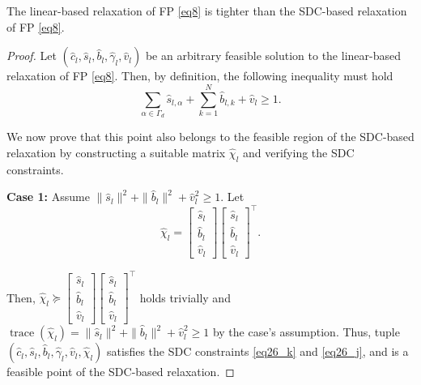 \documentclass[10pt,a4paper]{amsart}
\begin{document}
\begin{theorem} \label{thm4_2}
The linear-based relaxation of FP \eqref{eq8} is tighter than the SDC-based relaxation of FP \eqref{eq8}.
\end{theorem}

\begin{proof}
Let $\left(\hat{c}_l, \hat{s}_l, \hat{b}_l, \hat{\gamma}_l, \hat{v}_l\right)$ be an arbitrary feasible solution to the linear-based relaxation of FP \eqref{eq8}. Then, by definition, the following inequality must hold
\begin{equation} \label{eq:sum1}
\sum_{\alpha \in \Gamma_d} \hat{s}_{l,\alpha} + \sum_{k=1}^N \hat{b}_{l,k} + \hat{v}_l \ge 1.
\end{equation}

We now prove that this point also belongs to the feasible region of the SDC-based relaxation by constructing a suitable matrix $\hat{\chi}_l$ and verifying the SDC constraints.

\textbf{Case 1:} Assume $\|\hat{s}_l\|^2 + \|\hat{b}_l\|^2 + \hat{v}_l^2 \ge 1$. Let
\begin{equation}
\hat{\chi}_l = 
\begin{bmatrix}
\hat{s}_l \\
\hat{b}_l \\
\hat{v}_l
\end{bmatrix}
\begin{bmatrix}
\hat{s}_l \\
\hat{b}_l \\
\hat{v}_l
\end{bmatrix}^\top.
\end{equation}

Then, $\hat{\chi}_l \succeq \begin{bmatrix} \hat{s}_l \\ \hat{b}_l \\ \hat{v}_l \end{bmatrix} \begin{bmatrix} \hat{s}_l \\ \hat{b}_l \\ \hat{v}_l \end{bmatrix}^\top$ holds trivially and $\operatorname{trace}(\hat{\chi}_l)=\|\hat{s}_l\|^2 + \|\hat{b}_l\|^2 + \hat{v}_l^2 \ge 1$ by the case's assumption. Thus, tuple $(\hat{c}_l, \hat{s}_l, \hat{b}_l, \hat{\gamma}_l, \hat{v}_l, \hat{\chi}_l)$ satisfies the SDC constraints \eqref{eq26_k} and \eqref{eq26_j}, and is a feasible point of the SDC-based relaxation.


\end{proof}
\end{document}
